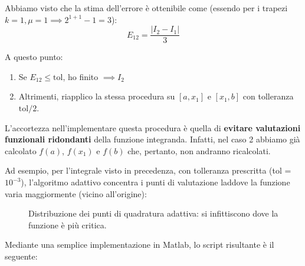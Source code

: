 Abbiamo visto che la stima dell'errore è ottenibile come (essendo per i trapezi $k=1, \mu=1 \implies 2^{1+1}-1 = 3$):
\begin{equation*}
E_{12} = \frac{|I_2 - I_1|}{3}
\end{equation*}

A questo punto:
\begin{enumerate}
    \item Se $E_{12} \le \text{tol}$, ho finito $\implies I_2$
    \item Altrimenti, riapplico la stessa procedura su $[a, x_1]$ e $[x_1, b]$ con tolleranza $\text{tol}/2$.
\end{enumerate}

L'accortezza nell'implementare questa procedura è quella di \textbf{evitare valutazioni funzionali ridondanti} della funzione integranda. Infatti, nel caso 2 abbiamo già calcolato $f(a)$, $f(x_1)$ e $f(b)$ che, pertanto, non andranno ricalcolati.

Ad esempio, per l'integrale visto in precedenza, con tolleranza prescritta (tol = $10^{-3}$), l'algoritmo adattivo concentra i punti di valutazione laddove la funzione varia maggiormente (vicino all'origine):

\begin{figure}[htbp]
    \centering
    \caption{Distribuzione dei punti di quadratura adattiva: si infittiscono dove la funzione è più critica.}
\end{figure}

Mediante una semplice implementazione in Matlab, lo script risultante è il seguente:

